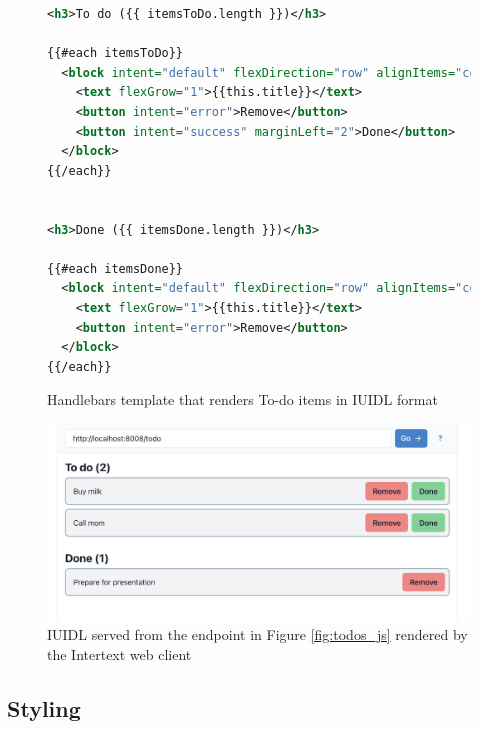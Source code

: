 \begin{figure}
\begin{minipage}{\linewidth}
\begin{lstlisting}[language=xml]
<h3>To do ({{ itemsToDo.length }})</h3>

{{#each itemsToDo}}
  <block intent="default" flexDirection="row" alignItems="center" paddingLeft="4">
    <text flexGrow="1">{{this.title}}</text>
    <button intent="error">Remove</button>
    <button intent="success" marginLeft="2">Done</button>
  </block>
{{/each}}


<h3>Done ({{ itemsDone.length }})</h3>

{{#each itemsDone}}
  <block intent="default" flexDirection="row" alignItems="center" paddingLeft="4">
    <text flexGrow="1">{{this.title}}</text>
    <button intent="error">Remove</button>
  </block>
{{/each}}
\end{lstlisting}
\end{minipage}
\caption{Handlebars template that renders To-do items in IUIDL format}%
\label{fig:todos_template}%
\end{figure}

\begin{figure}
  \centering
  \includegraphics[width=13cm]{thesis/paper/images/todos.png}
  \caption{IUIDL served from the endpoint in Figure \ref{fig:todos_js} rendered by the Intertext web client}%
  \label{fig:todos_output}%
\end{figure}

\subsection{Styling}

